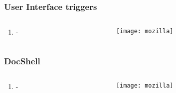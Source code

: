 \documentclass[
	notes=none,
	aspectratio=169
]{beamer}
\begin{document}

\begin{frame}
\frametitle{User Interface triggers}

\begin{columns}[T]
\begin{column}[T]{0.5\textwidth}
\setlength{\parskip}{0.5em}

\vspace{1.5cm}
\begin{enumerate}
\setlength{\parskip}{0.5em}
\item -
\end{enumerate}

\end{column}
\begin{column}[T]{0.5\textwidth}
\setlength{\parskip}{0.5em}

\vspace{0.5cm}
\texttt{[image: mozilla]}

\end{column}
\end{columns}

\end{frame}
\note{
\begin{enumerate}
\item -
\end{enumerate}
}


\begin{frame}
\frametitle{DocShell}

\begin{columns}[T]
\begin{column}[T]{0.5\textwidth}
\setlength{\parskip}{0.5em}

\vspace{1.5cm}
\begin{enumerate}
\setlength{\parskip}{0.5em}
\item -
\end{enumerate}

\end{column}
\begin{column}[T]{0.5\textwidth}
\setlength{\parskip}{0.5em}

\vspace{0.5cm}
\texttt{[image: mozilla]}

\end{column}
\end{columns}

\end{frame}
\note{
\begin{enumerate}
\item -
\end{enumerate}
}
\end{document}
